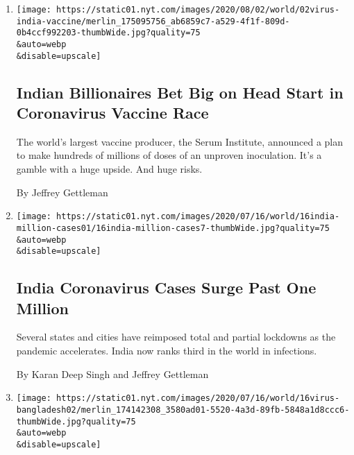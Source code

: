 \begin{enumerate}
\def\labelenumi{\arabic{enumi}.}
\item
  \href{/2020/08/01/world/asia/coronavirus-vaccine-india.html}{}

  \texttt{[image: https://static01.nyt.com/images/2020/08/02/world/02virus-india-vaccine/merlin\_175095756\_ab6859c7-a529-4f1f-809d-0b4ccf992203-thumbWide.jpg?quality=75\\\&auto=webp\\\&disable=upscale]}

  \hypertarget{indian-billionaires-bet-big-on-head-start-in-coronavirus-vaccine-race}{%
  \subsection{Indian Billionaires Bet Big on Head Start in Coronavirus
  Vaccine
  Race}\label{indian-billionaires-bet-big-on-head-start-in-coronavirus-vaccine-race}}

  The world's largest vaccine producer, the Serum Institute, announced a
  plan to make hundreds of millions of doses of an unproven inoculation.
  It's a gamble with a huge upside. And huge risks.

  By Jeffrey Gettleman
\item
  \href{/2020/07/16/world/asia/coronavirus-india-million-cases.html}{}

  \texttt{[image: https://static01.nyt.com/images/2020/07/16/world/16india-million-cases01/16india-million-cases7-thumbWide.jpg?quality=75\\\&auto=webp\\\&disable=upscale]}

  \hypertarget{india-coronavirus-cases-surge-past-one-million}{%
  \subsection{India Coronavirus Cases Surge Past One
  Million}\label{india-coronavirus-cases-surge-past-one-million}}

  Several states and cities have reimposed total and partial lockdowns
  as the pandemic accelerates. India now ranks third in the world in
  infections.

  By Karan Deep Singh and Jeffrey Gettleman
\item
  \href{/2020/07/16/world/asia/coronavirus-bangladesh-italy-certificates.html}{}

  \texttt{[image: https://static01.nyt.com/images/2020/07/16/world/16virus-bangladesh02/merlin\_174142308\_3580ad01-5520-4a3d-89fb-5848a1d8ccc6-thumbWide.jpg?quality=75\\\&auto=webp\\\&disable=upscale]}

  \hypertarget{big-business-in-bangladesh-selling-fake-coronavirus-certificates}{%
}
\end{enumerate}
